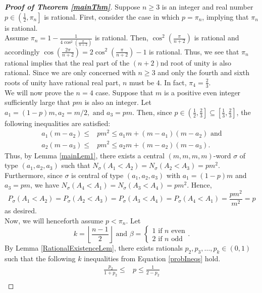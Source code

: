 \documentclass[11pt]{article}
\theoremstyle{definition}
\begin{document}
\begin{proof}[\bf{Proof of Theorem \ref{mainThm}}]
    Suppose $n \geq 3$ is an integer and real number $p \in \left( \frac{1}{2}, \pi_n \right]$ is rational. First, consider the case in which $p = \pi_n$, implying that $\pi_n$ is rational.
    \\[5mm]Assume $\pi_n = 1-\frac{1}{4\cos^2\left( \frac{\pi}{n+2} \right)}$ is rational. Then, $\cos^2\left( \frac{\pi}{n+2} \right)$ is rational and accordingly $\cos\left( \frac{2\pi}{n+2} \right) = 2\cos^2\left( \frac{\pi}{n+2} \right)-1$ is rational. Thus, we see that $\pi_n$ rational implies that the real part of the $(n+2)$nd root of unity is also rational.  Since we are only concerned with $n\geq 3$ and only the fourth and sixth roots of unity have rational real part, $n$ must be $4$. In fact, $\pi_4 = \frac{2}{3}$.
    \\[5mm]We will now prove the $n=4$ case. Suppose that $m$ is a positive even integer sufficiently large that $pm$ is also an integer. Let $a_1 = (1-p)m,a_2=m/2, \text{ and }a_3 = pm.$ Then, since $p \in \left( \frac{1}{2}, \frac{2}{3} \right] \subseteq \left[ \frac{1}{3}, \frac{2}{3} \right]$, the following inequalities are satisfied:
    \begin{align*}
        a_1(m-a_2) \leq &pm^2 \leq a_1m + (m-a_1)(m-a_2) \text{ and} \\
        a_2(m-a_3) \leq &pm^2 \leq a_2m+(m-a_2)(m-a_3).
    \end{align*}
    Thus, by Lemma \ref{mainLem1}, there exists a central $(m,m,m,m)$-word $\sigma$ of type $(a_1,a_2,a_3)$ such that $N_\sigma(A_1<A_2) = N_\sigma(A_2<A_3) = pm^2$. Furthermore, since $\sigma$ is central of type $(a_1,a_2,a_3)$ with $a_1 = (1-p)m$ and $a_3=pm$, we have $N_\sigma(A_4<A_1) = N_\sigma(A_3<A_4) = pm^2$. Hence,
    $$P_\sigma(A_1<A_2) = P_\sigma(A_2<A_3) = P_\sigma(A_3 < A_4) = P_\sigma(A_4<A_1) = \frac{pm^2}{m^2} = p$$
    as desired.
    \\[5mm]Now, we will henceforth assume $p < \pi_n$. Let $$k = \left\lfloor \frac{n-1}{2} \right\rfloor \text{ and } \beta = \begin{cases} 1 \text{ if } n \text{ even} \\ 2 \text{ if } n \text{ odd} \end{cases}.$$
    By Lemma \ref{RationalExistenceLem}, there exists rationals $p_2,p_3,\dots,p_k \in (0,1)$ such that the following $k$ inequalities from Equation \ref{probIneqs} hold.
    \begin{align*}
        \frac{p_2}{1+p_2} \leq &p \leq \frac{1}{2-p_2} \\

\end{align*}
\end{proof}
\end{document}
